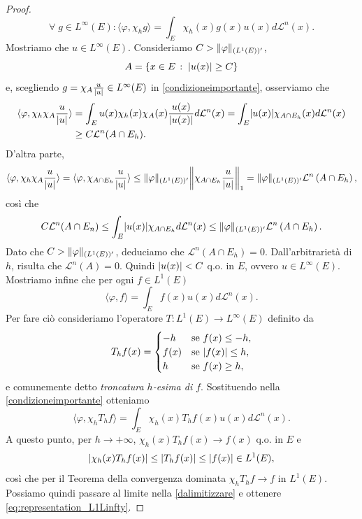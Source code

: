 \begin{proof}
\begin{equation}
		\forall \; g \in L^{\infty}(E): 	\langle \varphi,\chi_{h} g \rangle = \int_{E}\chi_{h}(x)g(x)u(x)d\mathcal{L}^{n}(x).
	\end{equation}
	Mostriamo che $u \in L^{\infty}(E) $. Consideriamo $C > \lVert\varphi\rVert_{(L^{1}(E))'}$, 
	\[ A = \left\lbrace x \in E \,:\; \lvert u(x)\rvert \ge C \right\rbrace  \]
	e, scegliendo $g = \chi_{A}\frac{u}{\lvert u\rvert} \in L^{\infty}(E)$ in \eqref{condizioneimportante}, osserviamo che
	\[
	\begin{split}
		\langle \varphi, \chi_{h}\chi_{A}\frac{u}{\lvert u\rvert}\rangle & = \int_{E}u(x)\chi_{h}(x)\chi_{A}(x)\frac{u(x)}{\lvert u(x)\rvert}d\mathcal{L}^{n}(x) = \int_{E}\lvert u(x)\rvert\chi_{A \cap E_{h}}(x)d\mathcal{L}^{n}(x) \\
		& \geq C\mathcal{L}^n(A \cap E_h).
	\end{split}
	\]
	D'altra parte,
	\[
	\begin{split}
		\langle \varphi, \chi_{h}\chi_{A}\frac{u}{\abs{u}}\rangle = \langle \varphi, \chi_{A \cap E_{h}}\frac{u}{\abs{u}}\rangle \le \norm{\varphi}_{(L^{1}(E))'}\norm*{\chi_{A \cap E_{h}}\frac{u}{\abs{u}}}_{1} = \norm{\varphi}_{(L^{1}(E))'}\mathcal{L}^{n}\left( A \cap E_{h}\right),
	\end{split}
	\]
	così che
	\[ C\mathcal{L}^{n}(A\cap E_{n}) \le \int_{E}\lvert u(x)\rvert\chi_{A \cap E_{h}}d\mathcal{L}^{n}(x) \le \lVert\varphi\rVert_{(L^{1}(E))'}\mathcal{L}^{n}\left( A \cap E_{h}\right).  \]
	Dato che $C > \lVert\varphi\rVert_{(L^{1}(E))'}$, deduciamo che $\mathcal{L}^{n}\left( A \cap E_{h}\right) = 0$. Dall'arbitrarietà di $h$, risulta che $\mathcal{L}^{n}\left( A \right) = 0$. Quindi $\lvert u(x)\rvert < C$ q.o. in $E$, ovvero $u \in L^{\infty}(E) $.\\
	
	Mostriamo infine che per ogni $f \in L^{1}(E)$
	\begin{equation}\label{eq:representation_L1Linfty}
		\langle \varphi, f \rangle = \int_{E}f(x)u(x)d\mathcal{L}^{n}(x).
	\end{equation}
	Per fare ciò consideriamo l'operatore $T : L^1(E) \to L^\infty(E)$ definito da
	\[ T_{h}f(x) = \begin{cases}
		-h & \textup{se } f(x) \le -h, \\
		f(x) & \textup{se } \lvert f(x)\rvert \le h, \\
		h & \textup{se } f(x) \ge h,
	\end{cases} \]
	e comunemente detto \emph{troncatura $h$-esima di $f$}. Sostituendo nella \eqref{condizioneimportante} otteniamo
	\begin{equation}\label{dalimitizzare}
		\langle \varphi,\chi_{h} T_{h}f \rangle = \int_{E}\chi_{h}(x)T_{h}f(x)u(x)d\mathcal{L}^{n}(x).
	\end{equation}
	A questo punto, per $h \to +\infty$, $\chi_{h}(x)T_{h}f(x) \to f(x)$ q.o. in $E$ e
	\[ \lvert\chi_{h}(x)T_{h}f(x)\rvert\le \lvert T_{h}f(x)\rvert \le \lvert f(x)\rvert \in L^{1}(E), \]
	così che per il Teorema della convergenza dominata $\chi_{h} T_{h}f \to f$ in $L^{1}(E)$. Possiamo quindi passare al limite nella \eqref{dalimitizzare} e ottenere \eqref{eq:representation_L1Linfty}.
	

\end{proof}
